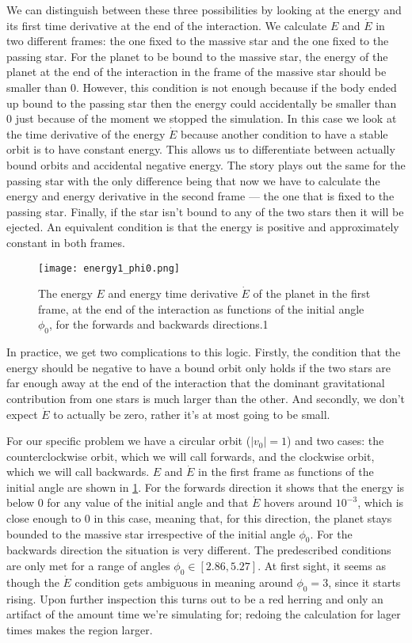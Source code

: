 \documentclass[10pt,a4paper,twocolumn]{article}
\begin{document}
We can distinguish between these three possibilities by looking at the energy and its first time derivative at the end of the interaction. We calculate $E$ and $\dot{E}$ in two different frames: the one fixed to the massive star and the one fixed to the passing star. For the planet to be bound to the massive star, the energy of the planet at the end of the interaction in the frame of the massive star should be smaller than $0$. However, this condition is not enough because if the body ended up bound to the passing star then the energy could accidentally be smaller than $0$ just because of the moment we stopped the simulation. In this case we look at the time derivative of the energy $\dot{E}$ because another condition to have a stable orbit is to have constant energy. This allows us to differentiate between actually bound orbits and accidental negative energy. The story plays out the same for the passing star with the only difference being that now we have to calculate the energy and energy derivative in the second frame --- the one that is fixed to the passing star. Finally, if the star isn't bound to any of the two stars then it will be ejected. An equivalent condition is that the energy is positive and approximately constant in both frames.

\begin{figure}[t]
    \centering
    \texttt{[image: energy1\_phi0.png]}
    \caption{The energy $E$ and energy time derivative $\dot{E}$ of the planet in the first frame, at the end of the interaction as functions of the initial angle $\phi_0$, for the forwards and backwards directions.1}
    \label{fig:energy1_phi0}
\end{figure}

In practice, we get two complications to this logic. Firstly, the condition that the energy should be negative to have a bound orbit only holds if the two stars are far enough away at the end of the interaction that the dominant gravitational contribution from one stars is much larger than the other. And secondly, we don't expect $\dot{E}$ to actually be zero, rather it's at most going to be small.

For our specific problem we have a circular orbit ($|v_0|=1$) and two cases: the counterclockwise orbit, which we will call forwards, and the clockwise orbit, which we will call backwards. $E$ and $\dot{E}$ in the first frame as functions of the initial angle are shown in \cref{fig:energy1_phi0}. For the forwards direction it shows that the energy is below $0$ for any value of the initial angle and that $\dot{E}$ hovers around $10^{-3}$, which is close enough to $0$ in this case, meaning that, for this direction, the planet stays bounded to the massive star irrespective of the initial angle $\phi_0$. For the backwards direction the situation is very different. The predescribed conditions are only met for a range of angles $\phi_0 \in [2.86, 5.27]$. At first sight, it seems as though the $\dot{E}$ condition gets ambiguous in meaning around $\phi_0 = 3$, since it starts rising. Upon further inspection this turns out to be a red herring and only an artifact of the amount time we're simulating for; redoing the calculation for lager times makes the region larger.
\end{document}
